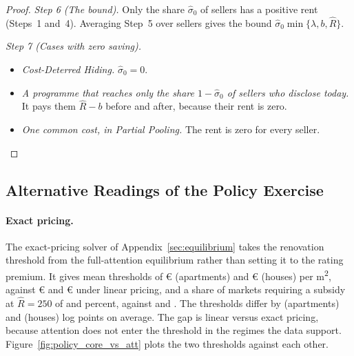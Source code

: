 \begin{proof}
\emph{Step 6 (The bound).} Only the share $\hat\sigma_0$ of sellers has a positive rent (Steps~1 and~4). Averaging Step~5 over sellers gives the bound $\hat\sigma_0\min\{\lambda,b,\hat R\}$.

\emph{Step 7 (Cases with zero saving).}
\begin{itemize}
    \item \emph{Cost-Deterred Hiding.} $\hat\sigma_0=0$.
    \item \emph{A programme that reaches only the share $1-\hat\sigma_0$ of sellers who disclose today.} It pays them $\hat R-b$ before and after, because their rent is zero.
    \item \emph{One common cost, in Partial Pooling.} The rent is zero for every seller.
\end{itemize}
\end{proof}

\subsection*{Alternative Readings of the Policy Exercise}

\paragraph{Exact pricing.}
The exact-pricing solver of Appendix~\ref{sec:equilibrium} takes the renovation threshold from the full-attention equilibrium rather than setting it to the rating premium. It gives mean thresholds of \euro{}\attRbarCoreEurTwoFiftyApt{} (apartments) and \euro{}\attRbarCoreEurTwoFiftyHouse{} (houses) per m\textsuperscript{2}, against \euro{}\attScBaseRbarApt{} and \euro{}\attScBaseRbarHouse{} under linear pricing, and a share of markets requiring a subsidy at $\hat R=250$ of \attSharePosCoreTwoFiftyApt{} and \attSharePosCoreTwoFiftyHouse{} percent, against \attScBaseShareTwoFiftyApt{} and \attScBaseShareTwoFiftyHouse{}. The thresholds differ by \attRbarGapApt{} (apartments) and \attRbarGapHouse{} (houses) log points on average. The gap is linear versus exact pricing, because attention does not enter the threshold in the regimes the data support. Figure~\ref{fig:policy_core_vs_att} plots the two thresholds against each other.

